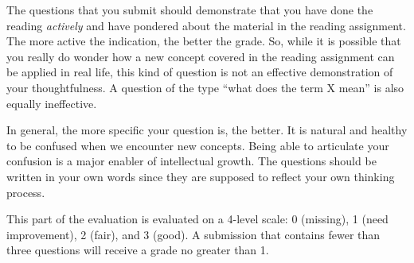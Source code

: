 \documentclass{article}
\begin{document}
\noindent The questions that you submit should demonstrate that you have done the reading \textit{actively} and have pondered about the material in the reading assignment. The more active the indication, the better the grade. So, while it is possible that you really do wonder how a new concept covered in the reading assignment can be applied in real life, this kind of question is not an effective demonstration of your thoughtfulness. A question of the type ``what does the term X mean'' is also equally ineffective.

In general, the more specific your question is, the better. It is natural and healthy to be confused when we encounter new concepts. Being able to articulate your confusion is a major enabler of intellectual growth. The questions should be written in your own words since they are supposed to reflect your own thinking process.

This part of the evaluation is evaluated on a 4-level scale: 0 (missing), 1 (need improvement), 2 (fair), and 3 (good). A submission that contains fewer than three questions will receive a grade no greater than 1.
\end{document}
